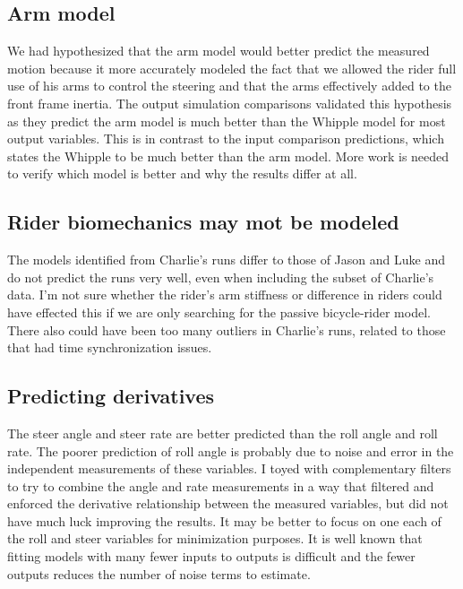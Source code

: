 \documentclass[a4paper]{article}
\begin{document}
\subsection{Arm model}

We had hypothesized that the arm model would better predict the measured
motion because it more accurately modeled the fact that we allowed the
rider full use of his arms to control the steering and that the arms
effectively added to the front frame inertia. The output simulation 
comparisons validated this hypothesis as they predict the arm
model is much better than the Whipple model for most output
variables. This is in contrast to the input comparison predictions, which states the Whipple
to be much better than the arm model. More work is needed to verify which model is better and why the
results differ at all.

\subsection{Rider biomechanics may mot be modeled}

The models identified from Charlie's runs differ to those of Jason and
Luke and do not predict the runs very well, even when including the subset 
of Charlie's data. I'm not sure whether the rider's arm
stiffness or difference in riders could have effected
this if we are only searching for the passive bicycle-rider model. There also 
could have been too many outliers in Charlie's runs, related to those that had time synchronization
issues.

\subsection{Predicting derivatives}

The steer angle and steer rate are better predicted than the roll angle and
roll rate.  The poorer
prediction of roll angle is probably due to noise and error in the
independent measurements of these variables. I toyed with complementary
filters to try to combine the angle and rate measurements in a way that
filtered and enforced the derivative relationship between the measured
variables, but did not have much luck improving the results. It may be
better to focus on one each of the roll and steer variables for
minimization purposes. It is well known that fitting models with many
fewer inputs to outputs is difficult and the fewer outputs reduces the
number of noise terms to estimate.
\end{document}
